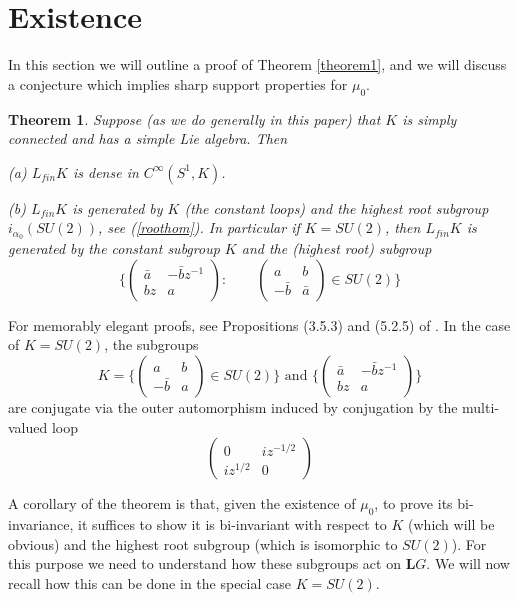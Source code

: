 \documentclass{amsart}
\newtheorem{theorem}{Theorem}[section]
\theoremstyle{conjecture}
\theoremstyle{definition}
\theoremstyle{question}
\theoremstyle{questions}
\theoremstyle{remark}
\theoremstyle{remarks}
\theoremstyle{example}
\numberwithin{equation}{section}
\begin{document}
\section{Existence}\label{existence}

In this section we will outline a proof of Theorem \ref{theorem1}, and we will discuss a 
conjecture which implies sharp support properties for $\mu_0$.

\begin{theorem} Suppose (as we do generally in this paper) that $K$ is simply connected and has a simple Lie algebra. Then\

(a) $L_{fin}K$ is dense in $C^{\infty}(S^1,K)$.\

(b) $L_{fin}K$ is generated by $K$ (the constant loops)
and the highest root subgroup $i_{\alpha_0}(SU(2))$, see (\ref{roothom}).
In particular if $K=SU(2)$, then $L_{fin}K$ is generated by the constant subgroup $K$
and the (highest root) subgroup
$$\{\left(\begin{matrix} \bar a&-\bar bz^{-1}\\
bz&a\end{matrix} \right): \qquad \left(\begin{matrix} a&b\\
-\bar {b}&\bar {a}\end{matrix} \right)\in SU(2)\}$$
\end{theorem}

For memorably elegant proofs, see Propositions (3.5.3) and (5.2.5) of \cite{PS}. In the case of $K=SU(2)$, the subgroups
$$K=\{\left(\begin{matrix} a& b\\
-\bar{b}&a\end{matrix} \right)\in SU(2)\} \text{ and } \{\left(\begin{matrix} \bar a&-\bar bz^{-1}\\
bz&a\end{matrix} \right)\} $$
are conjugate via the outer automorphism induced by conjugation by the multi-valued loop
$$\left(\begin{matrix} 0& iz^{-1/2}\\ iz^{1/2}&0 \end{matrix}\right)$$

A corollary of the theorem is that, given the existence of $\mu_0$, to prove its bi-invariance, it suffices
to show it is bi-invariant with respect to $K$ (which will be obvious) and the highest root subgroup (which is isomorphic to $SU(2)$).
For this purpose we need to understand how these subgroups act on $\mathbf LG$. We will now recall how this
can be done in the special case $K=SU(2)$.
\end{document}
